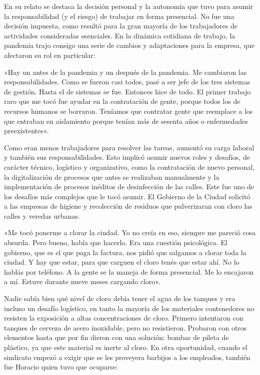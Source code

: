 \begin{refsection}
\begin{gbcita}
\end{gbcita}

En su relato se destaca la decisión personal y la autonomía que tuvo para asumir la responsabilidad (y el riesgo) de trabajar en forma presencial. No fue una decisión impuesta, como resultó para la gran mayoría de los trabajadores de actividades consideradas esenciales. En la dinámica cotidiana de trabajo, la pandemia trajo consigo una serie de cambios y adaptaciones para la empresa, que afectaron su rol en particular:


\begin{gbcita}
«Hay un antes de la pandemia y un después de la pandemia. Me cambiaron las responsabilidades. Como se fueron casi todos, pasé a ser jefe de los tres sistemas de gestión. Hasta el de sistemas se fue. Entonces hice de todo. El primer trabajo raro que me tocó fue ayudar en la contratación de gente, porque todos los de recursos humanos se borraron. Teníamos que contratar gente que reemplace a los que entraban en aislamiento porque tenían más de sesenta años o enfermedades preexistentes».

\end{gbcita}

Como eran menos trabajadores para resolver las tareas, aumentó su carga laboral y también sus responsabilidades. Esto implicó asumir nuevos roles y desafíos, de carácter técnico, logístico y organizativo, como la contratación de nuevo personal, la digitalización de procesos que antes se realizaban manualmente y la implementación de procesos inéditos de desinfección de las calles. Este fue uno de los desafíos más complejos que le tocó asumir. El Gobierno de la Ciudad solicitó a las empresas de higiene y recolección de residuos que pulverizaran con cloro las calles y veredas urbanas.


\begin{gbcita}
«Me tocó ponerme a clorar la ciudad. Yo no creía en eso, siempre me pareció cosa absurda. Pero bueno, había que hacerlo. Era una cuestión psicológica. El gobierno, que es el que paga la factura, nos pidió que salgamos a clorar toda la ciudad. Y hay que estar, para que carguen el cloro tenés que estar ahí. No lo hablás por teléfono. A la gente se la maneja de forma presencial. Me lo encajaron a mí. Estuve durante nueve meses cargando cloro».

\end{gbcita}

Nadie sabía bien qué nivel de cloro debía tener el agua de los tanques y era incluso un desafío logístico, en tanto la mayoría de los materiales contenedores no resisten la exposición a altas concentraciones de cloro. Primero intentaron con tanques de cerveza de acero inoxidable, pero no resistieron. Probaron con otros elementos hasta que por fin dieron con una solución: bombas de pileta de plástico, ya que este material es inerte al cloro. En otra oportunidad, cuando el sindicato empezó a exigir que se les proveyera barbijos a los empleados, también fue Horacio quien tuvo que ocuparse:



\end{refsection}
